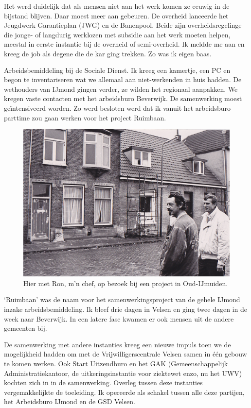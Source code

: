 \documentclass[10pt,twoside, openright]{memoir}
\begin{document}
Het werd duidelijk dat als mensen niet aan het werk komen ze eeuwig in de bijstand blijven. Daar moest meer aan gebeuren. De overheid lanceerde het Jeugdwerk-Garantieplan (JWG) en de Banenpool. Beide zijn overheidsregelinge die jonge- of langdurig werklozen met subsidie aan het werk moeten helpen, meestal in eerste instantie bij de overheid of semi-overheid. Ik meldde me aan en kreeg de job als degene die de kar ging trekken. Zo was ik eigen baas. 

Arbeidsbemiddeling bij de Sociale Dienst. Ik kreeg een kamertje, een PC en begon te inventariseren wat we allemaal aan niet-werkenden in huis hadden. De wethouders van IJmond gingen verder, ze wilden het regionaal aanpakken. We kregen vaste contacten met het arbeidsburo Beverwijk. De samenwerking moest geïntensiveerd worden. Zo werd besloten werd dat ik vanuit het arbeidsburo parttime zou gaan werken voor het project Ruimbaan.

\begin{figure}
\includegraphics[width=\textwidth]{img/ch46/velse_0001}
\caption*{\footnotesize Hier met Ron, m’n chef, op bezoek bij een project in Oud-IJmuiden.}
\end{figure}

`Ruimbaan' was de naam voor het samenwerkingsproject van de gehele IJmond inzake arbeidsbemiddeling. Ik bleef drie dagen in Velsen en ging twee dagen in de week naar Beverwijk. In een latere fase kwamen er ook mensen uit de andere gemeenten bij. 

De samenwerking met andere instanties kreeg een nieuwe impuls toen we de mogelijkheid hadden om met de Vrijwilligerscentrale Velsen samen in één gebouw te komen werken. Ook Start Uitzendburo en het GAK (Gemeenschappelijk Administratiekantoor, de uitkeringsinstantie voor ziektewet enzo, nu het UWV) kochten zich in in de samenwerking. Overleg tussen deze instanties vergemakkelijkte de toeleiding. Ik opereerde als schakel tussen alle deze partijen, het Arbeidsburo IJmond en de GSD Velsen. 
\end{document}
